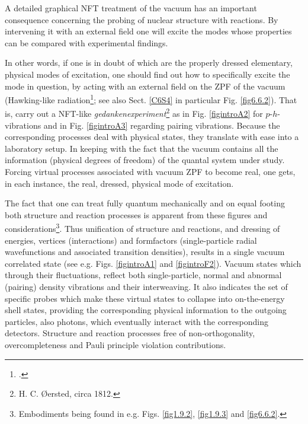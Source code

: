 A detailed graphical NFT treatment of the vacuum has an important consequence concerning the probing of nuclear structure with reactions. By intervening it with an external field one will excite the modes whose properties can be  compared with experimental findings.

In other words, if one is in doubt of which are the properly dressed elementary, physical modes of excitation, one should find out how to specifically excite the  mode in question, by acting with an external field on the ZPF of the vacuum (Hawking-like radiation\footnote{\cite{Barranco:19b}.}; see also Sect. \ref{C6S4} in particular Fig. \ref{fig6.6.2}). That is,  carry out a NFT-like \textit{gedankenexperiment}\footnote{H. C. \O{}ersted, circa 1812.} as in Fig. \ref{figintroA2} for $p$-$h$-vibrations and in Fig. \ref{figintroA3} regarding pairing vibrations. Because the corresponding processes deal  with physical states, they translate with ease into a laboratory setup. In keeping with the fact that the vacuum contains all the information (physical degrees of freedom) of the quantal system under study. Forcing virtual processes associated  with vacuum ZPF to become real, one   gets, in each instance, the real, dressed, physical mode of excitation. 

The fact that one can treat fully quantum mechanically and on equal footing both structure and reaction processes is apparent from these figures and considerations\footnote{Embodiments being found in e.g. Figs. \ref{fig1.9.2}, \ref{fig1.9.3} and  \ref{fig6.6.2}.}. Thus unification of structure and reactions, and dressing of energies, vertices (interactions) and formfactors (single-particle radial wavefunctions and associated transition densities), results in a single vacuum correlated state (see e.g. Figs. \ref{figintroA1} and \ref{figintroF2}). Vacuum states which through their fluctuations, reflect both single-particle, normal and abnormal (pairing) density vibrations and their interweaving.  It also indicates the  set of specific probes which make  these virtual states to collapse into on-the-energy shell states, providing the corresponding physical information to the   outgoing particles, also photons, which eventually interact with the corresponding detectors. Structure and reaction processes free of non-orthogonality, overcompleteness and Pauli principle violation contributions.


